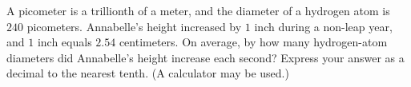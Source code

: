 A picometer is a trillionth of a meter, and the diameter of a hydrogen atom is $240$ picometers. Annabelle's height increased by $1$ inch during a non-leap year, and $1$ inch equals $2.54$ centimeters. On average, by how many hydrogen-atom diameters did Annabelle's height increase each second? Express your answer as a decimal to the nearest tenth. (A calculator may be used.)
